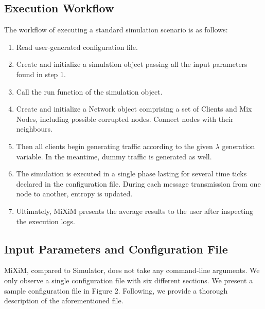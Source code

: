 \documentclass[logo,msc,cyber]{infthesis}   %
\begin{document}
\subsection{Execution Workflow}

The workflow of executing a standard simulation scenario is as follows:

\begin{enumerate}
    \item Read user-generated configuration file.
    \item Create and initialize a simulation object passing all the input
    parameters found in step 1.
    \item Call the run function of the simulation object.
    \item Create and initialize a Network object comprising a set of Clients and
    Mix Nodes, including possible corrupted nodes. Connect nodes with their
    neighbours.
    \item Then all clients begin generating traffic according to the given $\lambda$
    generation variable. In the meantime, dummy traffic is generated as well.
    \item The simulation is executed in a single phase lasting for several time
    ticks declared in the configuration file. During each message transmission
    from one node to another, entropy is updated.
    \item Ultimately, MiXiM presents the average results to the user after
    inspecting the execution logs.
\end{enumerate}

\subsection{Input Parameters and Configuration File}

MiXiM, compared to Simulator, does not take any command-line arguments. We only
observe a single configuration file with six different sections. We present a
sample configuration file in Figure 2. Following, we provide a thorough
description of the aforementioned file.
\end{document}
